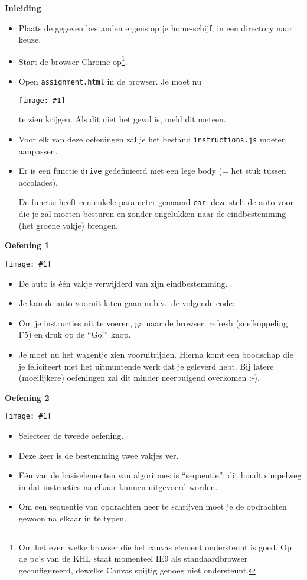 \documentclass[a4paper]{article}
\newcommand{\newexercise}[1]{\clearpage\begin{center}\Huge\bf #1\end{center}}
\newcommand{\exercisemap}[1]{\begin{center}\texttt{[image: \#1]}\end{center}}
\newcommand{\code}[1]{
  \begin{center}
    \begin{minipage}{.8\linewidth}
      
    \end{minipage}
  \end{center}
}
\begin{document}
\newexercise{Inleiding}
\begin{itemize}
  \item Plaats de gegeven bestanden ergens op je home-schijf, in een directory naar keuze.
  \item Start de browser Chrome op\footnote{Om het even welke browser
        die het canvas element ondersteunt is goed. Op de pc's van de KHL
        staat momenteel IE9 als standaardbrowser geconfigureerd, dewelke
        Canvas spijtig genoeg niet ondersteunt.}.
  \item Open \verb'assignment.html' in de browser. Je moet nu
        \exercisemap{ex1} te zien krijgen. Als dit niet het geval is,
        meld dit meteen.
  \item Voor elk van deze oefeningen zal je het bestand \verb'instructions.js' moeten aanpassen.
  \item Er is een functie \verb'drive' gedefinieerd met een lege body (= het stuk tussen accolades).
        \code{drive.js}
        De functie heeft een enkele parameter genaamd \verb'car': deze
        stelt de auto voor die je zal moeten besturen en zonder ongelukken
        naar de eindbestemming (het groene vakje) brengen.
\end{itemize}


\newexercise{Oefening 1}
\exercisemap{ex1}

\begin{itemize}
  \item De auto is \'e\'en vakje verwijderd van zijn eindbestemming.
  \item Je kan de auto vooruit laten gaan m.b.v.\ de volgende code:
        \code{forward.js}
  \item Om je instructies uit te voeren, ga naar de browser, refresh (snelkoppeling F5) en druk op de ``Go!'' knop.
  \item Je moet nu het wagentje zien vooruitrijden. Hierna komt
        een boodschap die je feliciteert met het uitmuntende werk dat je geleverd
        hebt. Bij latere (moeilijkere) oefeningen zal dit minder neerbuigend overkomen :-).
\end{itemize}


\newexercise{Oefening 2}
\exercisemap{ex2}

\begin{itemize}
  \item Selecteer de tweede oefening.
  \item Deze keer is de bestemming twee vakjes ver.
  \item E\'en van de basiselementen van algoritmes is ``sequentie'':
        dit houdt simpelweg in dat instructies na elkaar
        kunnen uitgevoerd worden.
  \item Om een sequentie van opdrachten neer te schrijven
        moet je de opdrachten gewoon na elkaar in te typen.
\end{itemize}
\end{document}

